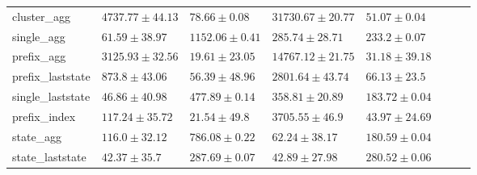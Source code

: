 \documentclass[twoside,11pt]{Latex/Classes/PhDthesisPSnPDF}
\begin{document}
\begin{table}[h]
{\begin{tabular}{llllllll}
			cluster\_agg & $4737.77 \pm 44.13$ & $78.66 \pm 0.08$ & $31730.67 \pm 20.77$ & $51.07 \pm 0.04$ \\ 
			single\_agg & $61.59 \pm 38.97$ & $1152.06 \pm 0.41$ & $285.74 \pm 28.71$ & $233.2 \pm 0.07$ \\ 
			prefix\_agg & $3125.93 \pm 32.56$ & $\mathbf{19.61 \pm 23.05}$ & $14767.12 \pm 21.75$ & $\mathbf{31.18 \pm 39.18}$ \\ 
			prefix\_laststate & $873.8 \pm 43.06$ & $56.39 \pm 48.96$ & $2801.64 \pm 43.74$ & $66.13 \pm 23.5$ \\ 
			single\_laststate & $46.86 \pm 40.98$ & $477.89 \pm 0.14$ & $358.81 \pm 20.89$ & $183.72 \pm 0.04$ \\ 
			prefix\_index & $117.24 \pm 35.72$ & $21.54 \pm 49.8$ & $3705.55 \pm 46.9$ & $43.97 \pm 24.69$ \\ 
			state\_agg & $116.0 \pm 32.12$ & $786.08 \pm 0.22$ & $62.24 \pm 38.17$ & $180.59 \pm 0.04$ \\ 
			state\_laststate & $\mathbf{42.37 \pm 35.7}$ & $287.69 \pm 0.07$ & $\mathbf{42.89 \pm 27.98}$ & $280.52 \pm 0.06$ \\ 
			\bottomrule
			
		\end{tabular}%
	}
\end{table}


\end{document}
